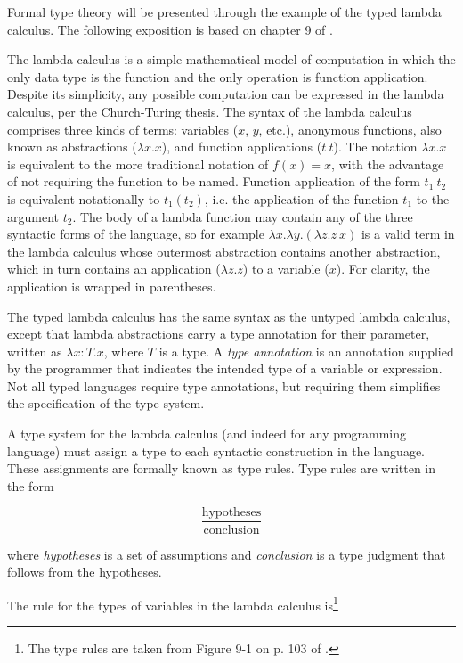 \documentclass{article}
\begin{document}
Formal type theory will be presented through the example of the typed lambda calculus. The following exposition is based on chapter 9 of \cite{types}.

The lambda calculus is a simple mathematical model of computation in which the only data type is the function and the only operation is function application. Despite its simplicity, any possible computation can be expressed in the lambda calculus, per the Church-Turing thesis. The syntax of the lambda calculus comprises three kinds of terms: variables ($x$, $y$, etc.), anonymous functions, also known as abstractions ($\lambda x . x$), and function applications ($t\ t$). The notation $\lambda x . x$ is equivalent to the more traditional notation of $f(x) = x$, with the advantage of not requiring the function to be named. Function application of the form $t_1\ t_2$ is equivalent notationally to $t_1(t_2)$, i.e. the application of the function $t_1$ to the argument $t_2$. The body of a lambda function may contain any of the three syntactic forms of the language, so for example $\lambda x . \lambda y . (\lambda z . z\ x)$ is a valid term in the lambda calculus whose outermost abstraction contains another abstraction, which in turn contains an application ($\lambda z . z$) to a variable ($x$). For clarity, the application is wrapped in parentheses.

The typed lambda calculus has the same syntax as the untyped lambda calculus, except that lambda abstractions carry a type annotation for their parameter, written as $\lambda x: T . x$, where $T$ is a type. A \textit{type annotation} is an annotation supplied by the programmer that indicates the intended type of a variable or expression. Not all typed languages require type annotations, but requiring them simplifies the specification of the type system.

A type system for the lambda calculus (and indeed for any programming language) must assign a type to each syntactic construction in the language. These assignments are formally known as type rules. Type rules are written in the form

\[
\frac{\text{hypotheses}}
{\text{conclusion}}
\]

\noindent where \textit{hypotheses} is a set of assumptions and \textit{conclusion} is a type judgment that follows from the hypotheses.

The rule for the types of variables in the lambda calculus is\footnote{The type rules are taken from Figure 9-1 on p. 103 of \cite{types}.}
\end{document}
